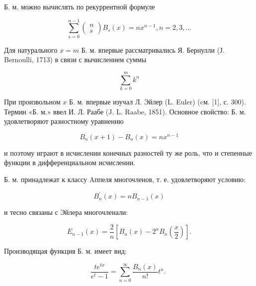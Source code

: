 \documentclass[10pt]{article}
\begin{document}
Б. м. можно вычислять по рекуррентной формуле



\[

\sum_{s=0}^{n-1}\left(\begin{array}{l}

n \\

s

\end{array}\right) B_{s}(x)=n x^{n-1}, n=2,3, \ldots

\]



Для натурального $x=m$ Б. м. впервые рассматривались Я. Бернулли (Ј. Bernoulli, 1713) в связи с вычислением суммы



\[

\sum_{k=0}^{m} k^{n}

\]



При произвольном $x$ Б. м. впервые изучал Л. Эйлер (L. Euler) (cм. [1], с. 300). Термин «Б. м.» ввел И. Л. Раабе (J. L. Raabe, 1851). Основное свойство: Б. м. удовлетворяют разностному уравнению



\[

B_{n}(x+1)-B_{n}(x)=n x^{n-1}

\]



и поэтому играют в исчислении конечных разностей ту же роль, что и степенные функции в дифференциальном исчислении.



Б. м. принадлежат к классу Aппеля многочленов, т. е. удовлетворяют условию:



\[

B_{n}^{\prime}(x)=n B_{n-1}(x)

\]



и тесно связаны с Эйлера многочленали:



\[

E_{n-1}(x)=\frac{2}{n}\left[B_{n}(x)-2^{n} B_{n}\left(\frac{x}{2}\right)\right] .

\]



Производящая функция Б. м. имеет вид:



\[

\frac{t e^{t x}}{e^{t}-1}=\sum_{n=0}^{\infty} \frac{B_{n}(x)}{n !} t^{n} \text {. }

\]
\end{document}
